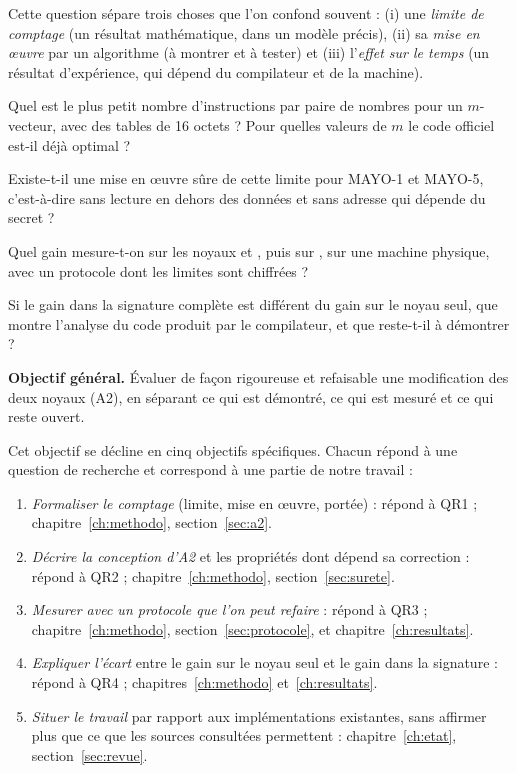 Cette question sépare trois choses que l'on confond souvent : (i) une \emph{limite de comptage} (un résultat mathématique, dans un modèle précis), (ii) sa \emph{mise en œuvre} par un algorithme (à montrer et à tester) et (iii) l'\emph{effet sur le temps} (un résultat d'expérience, qui dépend du compilateur et de la machine).

\begin{description}[leftmargin=2.2cm,labelwidth=2cm]
\item[QR1] Quel est le plus petit nombre d'instructions \vpshufb{} par paire de nombres pour un $m$-vecteur, avec des tables de 16 octets ? Pour quelles valeurs de $m$ le code officiel est-il déjà optimal ?
\item[QR2] Existe-t-il une mise en œuvre sûre de cette limite pour MAYO-1 et MAYO-5, c'est-à-dire sans lecture en dehors des données et sans adresse qui dépende du secret ?
\item[QR3] Quel gain mesure-t-on sur les noyaux  et , puis sur , sur une machine physique, avec un protocole dont les limites sont chiffrées ?
\item[QR4] Si le gain dans la signature complète est différent du gain sur le noyau seul, que montre l'analyse du code produit par le compilateur, et que reste-t-il à démontrer ?
\end{description}

\textbf{Objectif général.} Évaluer de façon rigoureuse et refaisable une modification des deux noyaux (A2), en séparant ce qui est démontré, ce qui est mesuré et ce qui reste ouvert.

Cet objectif se décline en cinq objectifs spécifiques. Chacun répond à une question de recherche et correspond à une partie de notre travail :
\begin{enumerate}[itemsep=1pt,label=\textbf{O\arabic*}]
\item \emph{Formaliser le comptage} (limite, mise en œuvre, portée) : répond à QR1 ; chapitre~\ref{ch:methodo}, section~\ref{sec:a2}.
\item \emph{Décrire la conception d'A2} et les propriétés dont dépend sa correction : répond à QR2 ; chapitre~\ref{ch:methodo}, section~\ref{sec:surete}.
\item \emph{Mesurer avec un protocole que l'on peut refaire} : répond à QR3 ; chapitre~\ref{ch:methodo}, section~\ref{sec:protocole}, et chapitre~\ref{ch:resultats}.
\item \emph{Expliquer l'écart} entre le gain sur le noyau seul et le gain dans la signature : répond à QR4 ; chapitres~\ref{ch:methodo} et~\ref{ch:resultats}.
\item \emph{Situer le travail} par rapport aux implémentations existantes, sans affirmer plus que ce que les sources consultées permettent : chapitre~\ref{ch:etat}, section~\ref{sec:revue}.
\end{enumerate}

